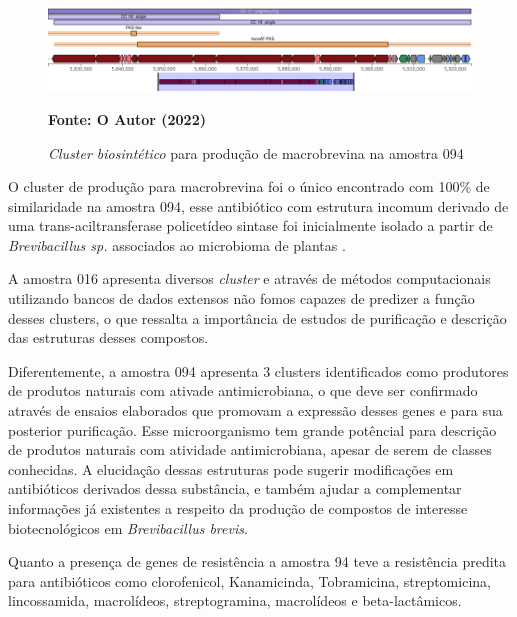 \begin{figure}[H]
	\caption{\textit{Cluster biosintético} para produção de macrobrevina na amostra 094}
	\label{fig:quast_16}
	\centering
		\includegraphics[width=0.8\linewidth]{imagens/antismash/094regiao4.png} \\
	\centering
    \begin{small}\textbf{Fonte: O Autor (2022)}\end{small}
\end{figure}
\vspace{\floatsep}

O cluster de produção para macrobrevina foi o único encontrado com 100\% de similaridade na amostra
094, esse antibiótico com estrutura incomum derivado de uma trans-aciltransferase policetídeo sintase foi inicialmente isolado
a partir de \textit{Brevibacillus sp.} associados ao microbioma de plantas \cite{helfrich2018bipartite}.

A amostra 016 apresenta diversos \textit{cluster} e através de métodos computacionais utilizando bancos
de dados extensos não fomos capazes de predizer a função desses clusters, o que ressalta a importância de 
estudos de purificação e descrição das estruturas desses compostos.

Diferentemente, a amostra 094 apresenta 3 clusters identificados como produtores de produtos naturais com
ativade antimicrobiana, o que deve ser confirmado através de ensaios elaborados que promovam a expressão
desses genes e para sua posterior purificação. Esse microorganismo tem grande potêncial para descrição de 
produtos naturais com atividade antimicrobiana, apesar de serem de classes conhecidas. A elucidação dessas
estruturas pode sugerir modificações em antibióticos derivados dessa substância, e também ajudar a complementar
informações já existentes a respeito da produção de compostos de interesse biotecnológicos em \textit{Brevibacillus brevis}.

Quanto a presença de genes de resistência a amostra 94 teve a resistência predita para antibióticos como clorofenicol,
Kanamicinda, Tobramicina, streptomicina, lincossamida, macrolídeos, streptogramina, macrolídeos e beta-lactâmicos. 

